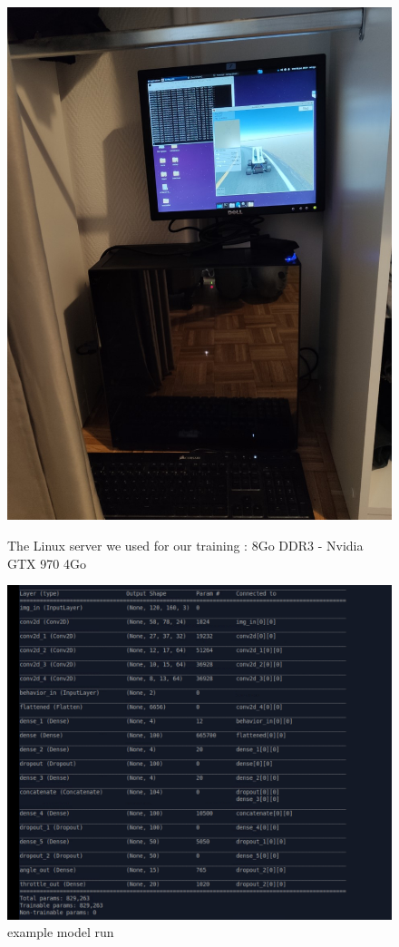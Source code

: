 \begin{figure}[H]
\centering
\begin{minipage}{6cm}
\centering
\includegraphics[scale=0.13]{img/linux.jpeg}
\caption{The Linux server we used for our training :   8Go DDR3 - Nvidia GTX 970 4Go}
\end{minipage}
\hspace{2cm}
\begin{minipage}{6cm}
\centering
\includegraphics[scale=0.13]{img/keras.png}
\caption{example model run}
\end{minipage}
\end{figure}

